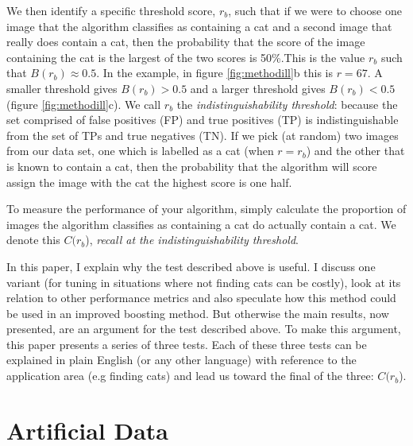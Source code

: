 \documentclass{article}
\begin{document}
We then identify a specific threshold score, $r_b$, such that if we were to choose one image that the algorithm classifies as containing a cat and a second image that really does contain a cat, then the probability that the score of the image containing the cat is the largest of the two scores is 50\%.This is the value $r_b$ such that $B(r_b) \approx 0.5$. In the example, in figure \ref{fig:methodill}b this is $r=67$. A smaller threshold gives $B(r_b) > 0.5$ and a larger threshold gives $B(r_b) < 0.5$ (figure \ref{fig:methodill}c). We call $r_b$ the {\it indistinguishability threshold}: because the set comprised of false positives (FP) and true positives (TP) is indistinguishable from the set of TPs and true negatives (TN). If we pick (at random) two images from our data set, one which is labelled as a cat (when $r=r_b$) and the other that is known to contain a cat, then the probability that the algorithm will score assign the  image with the cat the highest score is one half. 

To measure the performance of your algorithm, simply calculate the proportion of images the algorithm classifies as containing a cat do actually contain a cat. We denote this $C(r_b$), {\it recall at the indistinguishability threshold}.

In this paper, I explain why the test described above is useful. I discuss one variant (for tuning in situations where not finding cats can be costly), look at its relation to other performance metrics and also speculate how this method could be used in an improved boosting method. But otherwise the main results, now presented, are an argument for the test described above. To make this argument, this paper presents a series of three tests. Each of these three tests can be explained in plain English (or any other language) with reference to the application area (e.g finding cats) and lead us toward the final of the three: $C(r_b$).

\section{Artificial Data}
\end{document}
